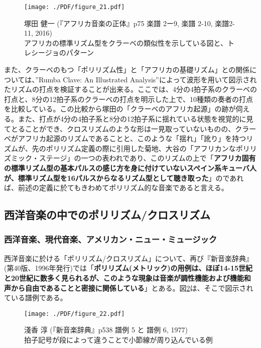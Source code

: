 \documentclass[uplatex,dvipdfmx]{ujarticle}
\begin{document}
\begin{figure}[ht]
\centerline{
	\texttt{[image: ./PDF/figure\_21.pdf]}
}
\caption{塚田 健一 (『アフリカ音楽の正体』p75 楽譜 2ー9, 楽譜 2-10, 楽譜2-11, 2016)\\
アフリカの標準リズム型をクラーベの類似性を示している図と、トレシージョのパターン}
\label{fig:figure_21}
\end{figure}

また、クラーベのもつ「ポリリズム性」と「アフリカの基礎リズム」との関係については、''Rumba Clave: An Illustrated Analysis''によって波形を用いて図示されたリズムの打点を検証することが出来る。ここでは、4分の4拍子系のクラーベの打点と、8分の12拍子系のクラーベの打点を明示した上で、10種類の奏者の打点を比較している。この比較から塚田の「クラーベのアフリカ起源」の跡が伺える。また、打点が4分の4拍子系と8分の12拍子系に揺れている状態を視覚的に見てとることができ、クロスリズムのような形は一見取っていないものの、クラーベがアフリカ起源のリズムであることと、このような「揺れ」「訛り」を持つリズムが、先のポリリズム定義の際に引用した菊地、大谷の「アフリカンなポリリズミック・ステージ」の一つの表われであり、このリズムの上で「{\bf アフリカ固有の標準リズム型の基本パルスの感じ方を身に付けていないスペイン系キューバ人が、標準リズム型を16パルスからなるリズム型として聴き取った}」\cite{tsukada:01}のであれば、前述の定義に於てもきわめてポリリズム的な音楽であると言える。

\subsection{西洋音楽の中でのポリリズム/クロスリズム}
\subsubsection{西洋音楽、現代音楽、アメリカン・ニュー・ミュージック \label{Western-Modern-AmericanNewMusic}}

西洋音楽に於ける「ポリリズム/クロスリズム」について、再び『新音楽辞典』(第40版、1996年発行)では「{\bf ポリリズム(メトリック)の用例は、ほぼ14-15世紀と20世紀に数多く見られるが、このような現象は音楽が調性機能および機能和声から自由であることと密接に関係している}」\cite{asaka:01}とある。図\ref{fig:figure_22}は、そこで図示されている譜例である。

\begin{figure}[ht]
\centerline{
	\texttt{[image: ./PDF/figure\_22.pdf]}
}
\caption{淺香 淳 (『新音楽辞典』p538 譜例 5 と 譜例 6, 1977)\\
拍子記号が段によって違うことで小節線が周り込んでいる例}
\label{fig:figure_22}
\end{figure}
\end{document}
